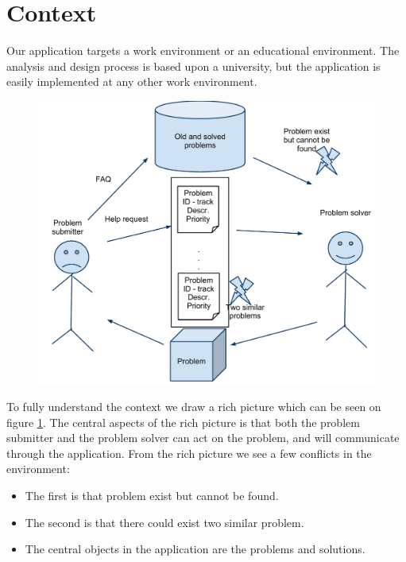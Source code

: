 \section{Context}
Our application targets a work environment or an educational environment.
The analysis and design process is based upon a university, but the application is easily implemented at any other work environment. 

\begin{figure}[ht]%
\includegraphics[scale = 0.42]{input/background/rich_picture.pdf}%
%
\label{fig:rich_picture}%
\end{figure}

To fully understand the context we draw a rich picture which can be seen on figure \ref{fig:rich_picture}. 
The central aspects of the rich picture is that both the problem submitter and the problem solver can act on the problem, and will communicate through the application. 
From the rich picture we see a few conflicts in the environment:
\begin{itemize}
		\item The first is that problem exist but cannot be found.
		\item The second is that there could exist two similar problem.
		\item The central objects in the application are the problems and solutions.
\end{itemize} 
\vspace{-3mm}

